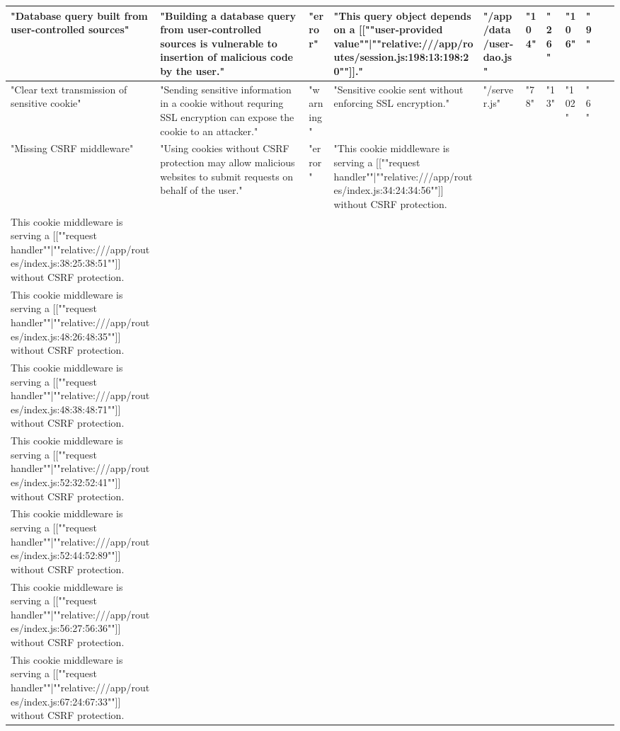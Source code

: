 \begin{table}[H]
\begin{tabular}{|l|l|l|l|l|l|l|l|l|l|}
      "Database query built from user-controlled sources" & "Building a database query from user-controlled sources is vulnerable to insertion of malicious code by the user." & "error" & "This query object depends on a [[""user-provided value""|""relative:///app/routes/session.js:198:13:198:20""]]." & "/app/data/user-dao.js" & "104" & "26" & "106" & "9" & ~ \\ \hline
      "Clear text transmission of sensitive cookie" & "Sending sensitive information in a cookie without requring SSL encryption can expose the cookie to an attacker." & "warning" & "Sensitive cookie sent without enforcing SSL encryption." & "/server.js" & "78" & "13" & "102" & "6" & ~ \\ \hline
      "Missing CSRF middleware" & "Using cookies without CSRF protection may allow malicious websites to submit requests on behalf of the user." & "error" & "This cookie middleware is serving a [[""request handler""|""relative:///app/routes/index.js:34:24:34:56""]] without CSRF protection. & ~ & ~ & ~ & ~ & ~ & ~ \\ \hline
      This cookie middleware is serving a [[""request handler""|""relative:///app/routes/index.js:38:25:38:51""]] without CSRF protection. & ~ & ~ & ~ & ~ & ~ & ~ & ~ & ~ & ~ \\ \hline
      This cookie middleware is serving a [[""request handler""|""relative:///app/routes/index.js:48:26:48:35""]] without CSRF protection. & ~ & ~ & ~ & ~ & ~ & ~ & ~ & ~ & ~ \\ \hline
      This cookie middleware is serving a [[""request handler""|""relative:///app/routes/index.js:48:38:48:71""]] without CSRF protection. & ~ & ~ & ~ & ~ & ~ & ~ & ~ & ~ & ~ \\ \hline
      This cookie middleware is serving a [[""request handler""|""relative:///app/routes/index.js:52:32:52:41""]] without CSRF protection. & ~ & ~ & ~ & ~ & ~ & ~ & ~ & ~ & ~ \\ \hline
      This cookie middleware is serving a [[""request handler""|""relative:///app/routes/index.js:52:44:52:89""]] without CSRF protection. & ~ & ~ & ~ & ~ & ~ & ~ & ~ & ~ & ~ \\ \hline
      This cookie middleware is serving a [[""request handler""|""relative:///app/routes/index.js:56:27:56:36""]] without CSRF protection. & ~ & ~ & ~ & ~ & ~ & ~ & ~ & ~ & ~ \\ \hline
      This cookie middleware is serving a [[""request handler""|""relative:///app/routes/index.js:67:24:67:33""]] without CSRF protection. & ~ & ~ & ~ & ~ & ~ & ~ & ~ & ~ & ~ \\ \hline

\end{tabular}
\end{table}
